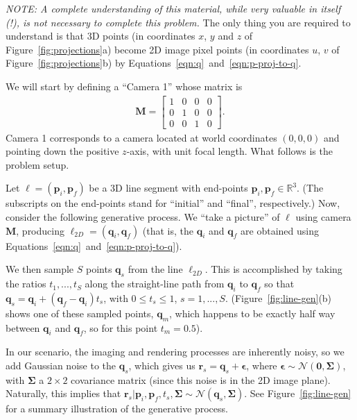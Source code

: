 \documentclass[10pt]{article}
\begin{document}
{\em NOTE: A complete understanding of this material, while very valuable in itself (!), is not necessary to complete this problem.}  The only thing you are required to understand is that 3D points (in coordinates $x$, $y$ and $z$ of Figure~\ref{fig:projections}a) become 2D image pixel points (in coordinates $u$, $v$ of Figure~\ref{fig:projections}b) by Equations~\ref{eqn:q}~and~\ref{eqn:p-proj-to-q}.

We will start by defining a ``Camera 1'' whose matrix is
\begin{eqnarray*}
\mathbf{M} = 
\begin{bmatrix}
1 & 0 & 0 & 0 \\
0 & 1 & 0 & 0 \\
0 & 0 & 1 & 0
\end{bmatrix}.
\end{eqnarray*}
Camera 1 corresponds to a camera located at world coordinates $(0,0,0)$ and pointing down the positive $z$-axis, with unit focal length.  What follows is the problem setup.

Let $\boldsymbol{\ell} = (\mathbf{p}_i, \mathbf{p}_f)$ be a 3D line segment with end-points $\mathbf{p}_i, \mathbf{p}_f \in \mathbb{R}^3$.  (The subscripts on the end-points stand for ``initial'' and ``final'', respectively.)  Now, consider the following generative process.  We ``take a picture'' of $\boldsymbol{\ell}$ using camera $\mathbf{M}$, producing $\boldsymbol{\ell}_{2D} = (\mathbf{q}_{i}, \mathbf{q}_{f})$ (that is, the $\mathbf{q}_{i}$ and $\mathbf{q}_{f}$ are obtained using Equations~\ref{eqn:q}~and~\ref{eqn:p-proj-to-q}).  

We then sample $S$ points $\mathbf{q}_s$ from the line $\boldsymbol{\ell}_{2D}$.  This is accomplished by taking the ratios $t_1, ..., t_S$ along the straight-line path from $\mathbf{q}_{i}$ to $\mathbf{q}_{f}$ so that $\mathbf{q}_s = \mathbf{q}_i + (\mathbf{q}_f - \mathbf{q}_i)t_s$, with $0 \leq t_s \leq 1$, $s = 1, ..., S$. (Figure~\ref{fig:line-gen}(b) shows one of these sampled points, $\mathbf{q}_m$, which happens to be exactly half way between $\mathbf{q}_{i}$ and $\mathbf{q}_{f}$, so for this point $t_m=0.5$).  

In our scenario, the imaging and rendering processes are inherently noisy, so we add Gaussian noise to the $\mathbf{q}_s$, which gives us $\mathbf{r}_s = \mathbf{q}_s + \boldsymbol{\epsilon}$, where $\boldsymbol{\epsilon} \sim \mathcal{N}(\mathbf{0}, \boldsymbol{\Sigma})$, with $\boldsymbol{\Sigma}$ a $2 \times 2$ covariance matrix (since this noise is in the 2D image plane).  Naturally, this implies that $\mathbf{r}_s | \mathbf{p}_i, \mathbf{p}_f, t_s, \boldsymbol{\Sigma} \sim \mathcal{N}(\mathbf{q}_s, \boldsymbol{\Sigma})$.  See Figure~\ref{fig:line-gen} for a summary illustration of the generative process. 
\end{document}
